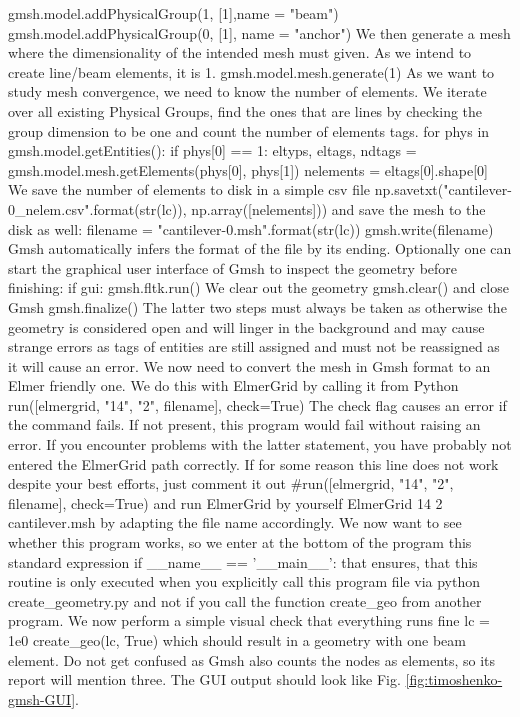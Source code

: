 \ttbegin
gmsh.model.addPhysicalGroup(1, [1],name = "beam")
\ttend  
\ttbegin  
gmsh.model.addPhysicalGroup(0, [1], name = "anchor")
\ttend
We then generate a mesh where the dimensionality of the intended mesh must given. As we intend to create line/beam elements, it is 1.
\ttbegin
gmsh.model.mesh.generate(1)
\ttend
As we want to study mesh convergence, we need to know the number of elements. We iterate over all existing Physical Groups, find the ones that are lines by checking the group dimension to be one and count the number of elements tags.
\ttbegin
for phys in gmsh.model.getEntities():
   if phys[0] == 1:
      eltyps, eltags, ndtags = gmsh.model.mesh.getElements(phys[0], 
                                                           phys[1]) 
      nelements = eltags[0].shape[0]
\ttend
We save the number of elements to disk in a simple csv file
\ttbegin
np.savetxt("cantilever-{0}_nelem.csv".format(str(lc)), np.array([nelements]))
\ttend
and save the mesh to the disk as well: 
\ttbegin
filename = "cantilever-{0}.msh".format(str(lc))
gmsh.write(filename)
\ttend
Gmsh automatically infers the format of the file by its ending. Optionally one can start the graphical user interface of Gmsh to inspect the geometry before finishing:
\ttbegin
if gui:
   gmsh.fltk.run()
\ttend 
We clear out the geometry
\ttbegin
gmsh.clear()
\ttend 
and close Gmsh
\ttbegin
gmsh.finalize()
\ttend 
The latter two steps must always be taken as otherwise the geometry is considered open and will linger in the background and may cause strange errors as tags of entities are still assigned and must not be reassigned as it will cause an error. We now need to convert the mesh in Gmsh format to an Elmer friendly one. We do this with ElmerGrid by calling it from Python
\ttbegin
run([elmergrid, "14", "2", filename], check=True)
\ttend
The check flag causes an error if the command fails. If not present, this program would fail without raising an error. If you encounter problems with the latter statement, you have probably not entered the ElmerGrid path correctly. If for some reason this line does not work despite your best efforts, just comment it out
\ttbegin
#run([elmergrid, "14", "2", filename], check=True)
\ttend
and run ElmerGrid by yourself 
\ttbegin
ElmerGrid 14 2 cantilever.msh
\ttend
by adapting the file name accordingly. We now want to see whether this program works, so we enter at the bottom of the program this standard expression
\ttbegin
if __name__ == '__main__':
\ttend 
that ensures, that this routine is only executed when you explicitly call this program file via
\ttbegin
python create_geometry.py
\ttend
and not if you call the function create\_geo from another program. We now perform a simple visual check that everything runs fine
\ttbegin
   lc = 1e0
   create_geo(lc, True)
\ttend
which should result in a geometry with one beam element. Do not get confused as Gmsh also counts the nodes as elements, so its report will mention three. The GUI output should look like Fig. \ref{fig:timoshenko-gmsh-GUI}. 

